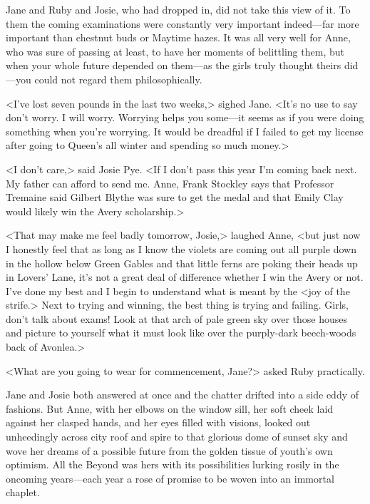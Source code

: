 Jane and Ruby and Josie, who had dropped in, did not take this view of it. To them the coming examinations were constantly very important indeed—far more important than chestnut buds or Maytime hazes. It was all very well for Anne, who was sure of passing at least, to have her moments of belittling them, but when your whole future depended on them—as the girls truly thought theirs did—you could not regard them philosophically.

<I've lost seven pounds in the last two weeks,> sighed Jane. <It's no use to say don't worry. I will worry. Worrying helps you some—it seems as if you were doing something when you're worrying. It would be dreadful if I failed to get my license after going to Queen's all winter and spending so much money.>

<I don't care,> said Josie Pye. <If I don't pass this year I'm coming back next. My father can afford to send me. Anne, Frank Stockley says that Professor Tremaine said Gilbert Blythe was sure to get the medal and that Emily Clay would likely win the Avery scholarship.>

<That may make me feel badly tomorrow, Josie,> laughed Anne, <but just now I honestly feel that as long as I know the violets are coming out all purple down in the hollow below Green Gables and that little ferns are poking their heads up in Lovers' Lane, it's not a great deal of difference whether I win the Avery or not. I've done my best and I begin to understand what is meant by the <joy of the strife.> Next to trying and winning, the best thing is trying and failing. Girls, don't talk about exams! Look at that arch of pale green sky over those houses and picture to yourself what it must look like over the purply-dark beech-woods back of Avonlea.>

<What are you going to wear for commencement, Jane?> asked Ruby practically.

Jane and Josie both answered at once and the chatter drifted into a side eddy of fashions. But Anne, with her elbows on the window sill, her soft cheek laid against her clasped hands, and her eyes filled with visions, looked out unheedingly across city roof and spire to that glorious dome of sunset sky and wove her dreams of a possible future from the golden tissue of youth's own optimism. All the Beyond was hers with its possibilities lurking rosily in the oncoming years—each year a rose of promise to be woven into an immortal chaplet.

\makeatletter
{}
{%
	\enlargethispage{\baselineskip}
}{%
}
\makeatother

